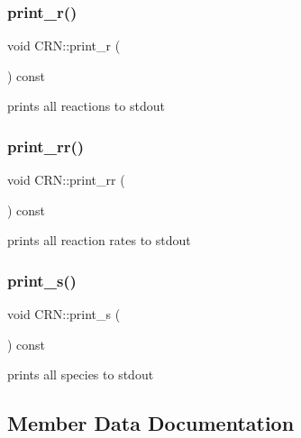 \subsubsection{\texorpdfstring{print\+\_\+r()}{print\_r()}}
{\footnotesize\ttfamily void C\+R\+N\+::print\+\_\+r (\begin{DoxyParamCaption}{ }\end{DoxyParamCaption}) const}



prints all reactions to stdout 

\mbox{\label{classCRN_a9ea712620fa755231213a59e4da33521}} 
\subsubsection{\texorpdfstring{print\+\_\+rr()}{print\_rr()}}
{\footnotesize\ttfamily void C\+R\+N\+::print\+\_\+rr (\begin{DoxyParamCaption}{ }\end{DoxyParamCaption}) const}



prints all reaction rates to stdout 

\mbox{\label{classCRN_a04e77ebd0aab58d87a87555a308c9191}} 
\subsubsection{\texorpdfstring{print\+\_\+s()}{print\_s()}}
{\footnotesize\ttfamily void C\+R\+N\+::print\+\_\+s (\begin{DoxyParamCaption}{ }\end{DoxyParamCaption}) const}



prints all species to stdout 



\subsection{Member Data Documentation}
\mbox{\label{classCRN_a7813e054c6e9ec84bc052a84c7ca2b11}} 
